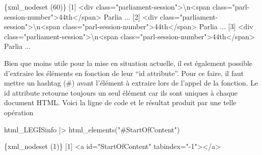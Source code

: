 \documentclass[
  letterpaper,
  DIV=11,
  numbers=noendperiod]{scrreprt}
\newenvironment{Shaded}{\begin{snugshade}}{\end{snugshade}}
\newcommand{\DataTypeTok}[1]{\textcolor[rgb]{0.68,0.00,0.00}{#1}}
\newcommand{\ErrorTok}[1]{\textcolor[rgb]{0.68,0.00,0.00}{#1}}
\newcommand{\ExtensionTok}[1]{\textcolor[rgb]{0.00,0.23,0.31}{#1}}
\newcommand{\KeywordTok}[1]{\textcolor[rgb]{0.00,0.23,0.31}{#1}}
\newcommand{\NormalTok}[1]{\textcolor[rgb]{0.00,0.23,0.31}{#1}}
\newcommand{\OperatorTok}[1]{\textcolor[rgb]{0.37,0.37,0.37}{#1}}
\newcommand{\StringTok}[1]{\textcolor[rgb]{0.13,0.47,0.30}{#1}}
\begin{document}
\begin{Shaded}
\begin{Highlighting}[]
\ExtensionTok{\{xml\_nodeset} \ErrorTok{(}\ExtensionTok{60}\KeywordTok{)}\ErrorTok{\}}
 \ExtensionTok{[1]} \OperatorTok{\textless{}}\NormalTok{div class=}\StringTok{"parliament{-}session"}\OperatorTok{\textgreater{}}\DataTypeTok{\textbackslash{}n}\OperatorTok{\textless{}}\NormalTok{span class=}\StringTok{"parl{-}session{-}number"}\OperatorTok{\textgreater{}}\NormalTok{44th}\OperatorTok{\textless{}}\NormalTok{/span}\OperatorTok{\textgreater{}}\NormalTok{ Parlia ...}
 \ExtensionTok{[2]} \OperatorTok{\textless{}}\NormalTok{div class=}\StringTok{"parliament{-}session"}\OperatorTok{\textgreater{}}\DataTypeTok{\textbackslash{}n}\OperatorTok{\textless{}}\NormalTok{span class=}\StringTok{"parl{-}session{-}number"}\OperatorTok{\textgreater{}}\NormalTok{44th}\OperatorTok{\textless{}}\NormalTok{/span}\OperatorTok{\textgreater{}}\NormalTok{ Parlia ...}
 \ExtensionTok{[3]} \OperatorTok{\textless{}}\NormalTok{div class=}\StringTok{"parliament{-}session"}\OperatorTok{\textgreater{}}\DataTypeTok{\textbackslash{}n}\OperatorTok{\textless{}}\NormalTok{span class=}\StringTok{"parl{-}session{-}number"}\OperatorTok{\textgreater{}}\NormalTok{44th}\OperatorTok{\textless{}}\NormalTok{/span}\OperatorTok{\textgreater{}}\NormalTok{ Parlia ...}
\end{Highlighting}
\end{Shaded}

Bien que moins utile pour la mise en situation actuelle, il est
également possible d'extraire les éléments en fonction de leur ``id
attribute''. Pour ce faire, il faut mettre un hashtag (\#) avant
l'élément à extraire lors de l'appel de la fonction. Le id attribute
retourne toujours un seul élément car ils sont uniques à chaque document
HTML. Voici la ligne de code et le résultat produit par une telle
opération

\begin{Shaded}
\begin{Highlighting}[]
\ExtensionTok{html\_LEGISinfo} \KeywordTok{|}\OperatorTok{\textgreater{}}\NormalTok{ html\_elements}\KeywordTok{(}\StringTok{"\#StartOfContent"}\KeywordTok{)}
\end{Highlighting}
\end{Shaded}

\begin{Shaded}
\begin{Highlighting}[]
\ExtensionTok{\{xml\_nodeset} \ErrorTok{(}\ExtensionTok{1}\KeywordTok{)}\ErrorTok{\}}
\ExtensionTok{[1]} \OperatorTok{\textless{}}\NormalTok{a id=}\StringTok{"StartOfContent"}\NormalTok{ tabindex=}\StringTok{"{-}1"}\OperatorTok{\textgreater{}\textless{}}\NormalTok{/a}\OperatorTok{\textgreater{}}
\end{Highlighting}
\end{Shaded}
\end{document}
